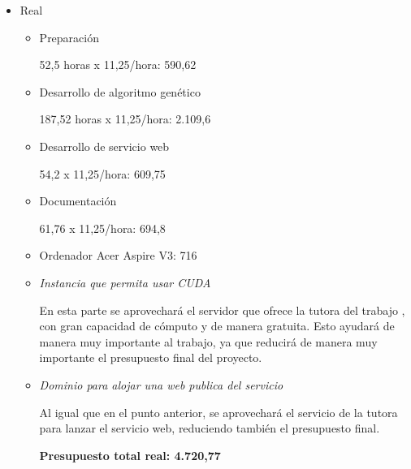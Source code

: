 \begin{itemize}
\begin{itemize}
		En caso de que no fuese posible, se contrataría un dominio por precios de 2,08\officialeuro a 4,95\officialeuro al mes (con permanencia de 12 meses, en las webs de alojamiento \textit{Hostpapa.es} \cite{hostpapa} y \textit{Dondominio.com} \cite{dondominio}): 2,08\officialeuro
		
		\bigskip
		\textbf{Presupuesto total estimado: 5.295,40\officialeuro (para el desarrollo y sólo un mes en producción) }
		
	\end{itemize}
	
	\item Real
	\begin{itemize}
		\item Preparación
		
		52,5 horas x 11,25\officialeuro/hora: 590,62\officialeuro
		
		\item Desarrollo de algoritmo genético
		
		187,52 horas x 11,25\officialeuro/hora: 2.109,6\officialeuro
		
		\item Desarrollo de servicio web
		
		54,2 x 11,25\officialeuro/hora: 609,75\officialeuro
		
		\item Documentación

		61,76 x 11,25\officialeuro/hora: 694,8\officialeuro
		
		\item Ordenador Acer Aspire V3:  716\officialeuro
				
		\item \textit{Instancia que permita usar CUDA}
		
		En esta parte se aprovechará el servidor que ofrece la tutora del trabajo {\tutor}, con gran capacidad de cómputo y de manera gratuita. Esto ayudará de manera muy importante al trabajo, ya que reducirá de manera muy importante el presupuesto final del proyecto.
		
		\item \textit{Dominio para alojar una web publica del servicio}
		
		Al igual que en el punto anterior, se aprovechará el servicio de la tutora para lanzar el servicio web, reduciendo también el presupuesto final.
		
		\bigskip
		\textbf{Presupuesto total real: 4.720,77 \officialeuro}
		
	\end{itemize}

\end{itemize}

